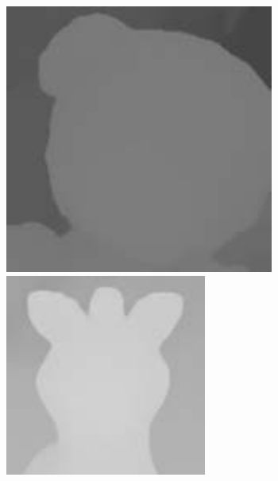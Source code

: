 \documentclass{bjtu-bachelor-thesis}
\begin{document}
\begin{figure}[!htbp]
\begin{minipage}[b]{\linewidth}
{\begin{minipage}[b]{0.085\linewidth}
      \includegraphics[width=\linewidth]{figures/doll/msg_0.pdf}\vspace{2pt}
      \includegraphics[width=\linewidth]{figures/doll/msg_1.pdf}

\end{minipage}}
\end{minipage}
\end{figure}
\end{document}
